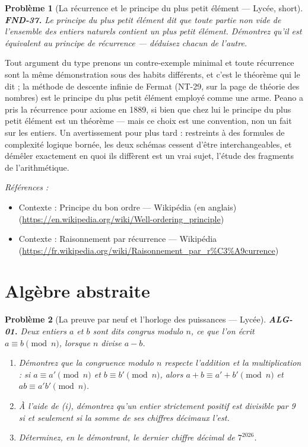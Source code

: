 \documentclass[11pt]{article}
\newtheorem{problem}{Problème}
\newenvironment{refs}{\par\small\noindent\emph{Références :}\begin{itemize}\setlength\itemsep{0pt}}{\end{itemize}\normalsize}
\begin{document}
\bigskip

\begin{problem}[{La récurrence et le principe du plus petit élément --- Lycée, short}]
\textbf{FND-37.} Le \textit{principe du plus petit élément} dit que toute partie
non vide de l'ensemble des entiers naturels contient un plus petit élément. Démontrez qu'il est
équivalent au principe de récurrence --- déduisez chacun de l'autre.
\end{problem}

\noindent Tout argument du type \og{} prenons un contre-exemple minimal \fg{} et toute récurrence
sont la même démonstration sous des habits différents, et c'est le théorème qui le dit ; la
méthode de descente infinie de Fermat (NT-29, sur la page de théorie des nombres) est le principe
du plus petit élément employé comme une arme. Peano a pris la récurrence pour axiome en 1889, si
bien que chez lui le principe du plus petit élément est un théorème --- mais ce choix est une
convention, non un fait sur les entiers. Un avertissement pour plus tard : restreints à des
formules de complexité logique bornée, les deux schémas cessent d'être interchangeables, et
démêler exactement en quoi ils diffèrent est un vrai sujet, l'étude des fragments de
l'arithmétique.

\begin{refs}
\item Contexte : Principe du bon ordre --- Wikipédia (en anglais) (\url{https://en.wikipedia.org/wiki/Well-ordering_principle})
\item Contexte : Raisonnement par récurrence --- Wikipédia (\url{https://fr.wikipedia.org/wiki/Raisonnement_par_r%C3%A9currence})
\end{refs}

\bigskip


\section*{Algèbre abstraite}

\begin{problem}[{La preuve par neuf et l'horloge des puissances --- Lycée}]
\textbf{ALG-01.} Deux entiers $a$ et $b$ sont dits \textit{congrus
modulo $n$}, ce que l'on écrit $a \equiv b \pmod{n}$, lorsque $n$ divise $a-b$.
\begin{enumerate}
\item[(i)] Démontrez que la
congruence modulo $n$ respecte l'addition et la multiplication : si $a \equiv a' \pmod{n}$ et
$b \equiv b' \pmod{n}$, alors $a+b \equiv a'+b' \pmod{n}$ et $ab \equiv a'b' \pmod{n}$.
\item[(ii)] À l'aide de (i), démontrez qu'un entier strictement positif est divisible par 9 si et seulement si la somme de ses
chiffres décimaux l'est.
\item[(iii)] Déterminez, en le démontrant, le dernier chiffre décimal de
$7^{2026}$.
\end{enumerate}

\end{problem}
\end{document}
